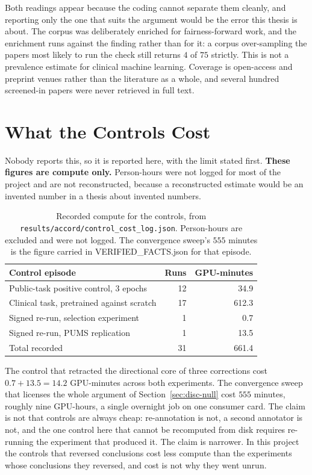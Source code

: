 Both readings appear because the coding cannot separate them cleanly, and
reporting only the one that suits the argument would be the error this thesis is
about. The corpus was deliberately enriched for fairness-forward work, and the
enrichment runs against the finding rather than for it: a corpus over-sampling
the papers most likely to run the check still returns $4$ of $75$ strictly. This
is not a prevalence estimate for clinical machine learning. Coverage is
open-access and preprint venues rather than the literature as a whole, and
several hundred screened-in papers were never retrieved in full text.

\section{What the Controls Cost}
\label{sec:disc-cost}

Nobody reports this, so it is reported here, with the limit stated first.
\textbf{These figures are compute only.} Person-hours were not logged for most
of the project and are not reconstructed, because a reconstructed estimate
would be an invented number in a thesis about invented numbers.

\begin{table}[H]
\centering
\caption{Recorded compute for the controls, from
\texttt{results/accord/control\_cost\_log.json}. Person-hours are excluded and
were not logged. The convergence sweep's $555$ minutes is the figure carried in
VERIFIED\_FACTS.json for that episode.}
\label{tab:disc-cost}
\begin{tabular}{lrr}
\toprule
\textbf{Control episode} & \textbf{Runs} & \textbf{GPU-minutes} \\
\midrule
Public-task positive control, 3 epochs    & 12 & 34.9 \\
Clinical task, pretrained against scratch & 17 & 612.3 \\
Signed re-run, selection experiment       & 1  & 0.7 \\
Signed re-run, PUMS replication           & 1  & 13.5 \\
\midrule
Total recorded                            & 31 & 661.4 \\
\bottomrule
\end{tabular}
\end{table}

The control that retracted the directional core of three corrections cost
$0.7 + 13.5 = 14.2$ GPU-minutes across both experiments. The convergence sweep that licenses the
whole argument of Section~\ref{sec:disc-null} cost $555$ minutes, roughly nine
GPU-hours, a single overnight job on one consumer card. The claim is not that
controls are always cheap: re-annotation is not, a second annotator is not, and
the one control here that cannot be recomputed from disk requires re-running the
experiment that produced it. The claim is narrower. In this project the controls
that reversed conclusions cost less compute than the experiments whose
conclusions they reversed, and cost is not why they went unrun.

